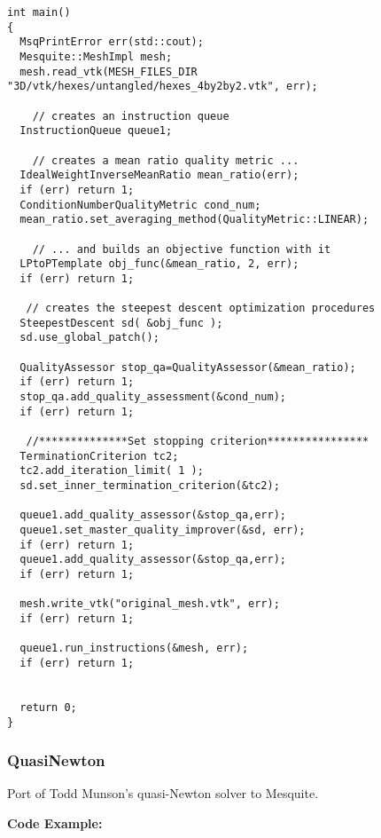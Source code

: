 \begin{lstlisting}[frame=single]
int main()
{
  MsqPrintError err(std::cout);
  Mesquite::MeshImpl mesh;
  mesh.read_vtk(MESH_FILES_DIR "3D/vtk/hexes/untangled/hexes_4by2by2.vtk", err);
  
    // creates an instruction queue
  InstructionQueue queue1;
  
    // creates a mean ratio quality metric ...
  IdealWeightInverseMeanRatio mean_ratio(err);
  if (err) return 1;
  ConditionNumberQualityMetric cond_num;
  mean_ratio.set_averaging_method(QualityMetric::LINEAR);
  
    // ... and builds an objective function with it
  LPtoPTemplate obj_func(&mean_ratio, 2, err);
  if (err) return 1;

   // creates the steepest descent optimization procedures
  SteepestDescent sd( &obj_func );
  sd.use_global_patch();
  
  QualityAssessor stop_qa=QualityAssessor(&mean_ratio);
  if (err) return 1;
  stop_qa.add_quality_assessment(&cond_num);
  if (err) return 1;
    
   //**************Set stopping criterion****************
  TerminationCriterion tc2;
  tc2.add_iteration_limit( 1 );
  sd.set_inner_termination_criterion(&tc2);

  queue1.add_quality_assessor(&stop_qa,err);
  queue1.set_master_quality_improver(&sd, err); 
  if (err) return 1;
  queue1.add_quality_assessor(&stop_qa,err);
  if (err) return 1;

  mesh.write_vtk("original_mesh.vtk", err); 
  if (err) return 1;
  
  queue1.run_instructions(&mesh, err);
  if (err) return 1;
  

  return 0;
}
\end{lstlisting}


\subsubsection{QuasiNewton}
Port of Todd Munson's quasi-Newton solver to Mesquite.

\textbf{Code Example:}

